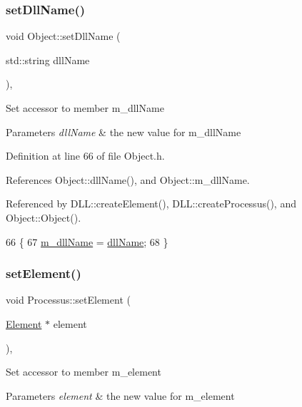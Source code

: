 \subsubsection{\texorpdfstring{set\+Dll\+Name()}{setDllName()}}
{\footnotesize\ttfamily void Object\+::set\+Dll\+Name (\begin{DoxyParamCaption}\item[{std\+::string}]{dll\+Name }\end{DoxyParamCaption})\hspace{0.3cm}{\ttfamily [inline]}, {\ttfamily [inherited]}}

Set accessor to member m\+\_\+dll\+Name 
\begin{DoxyParams}{Parameters}
{\em dll\+Name} & the new value for m\+\_\+dll\+Name \\
\hline
\end{DoxyParams}


Definition at line 66 of file Object.\+h.



References Object\+::dll\+Name(), and Object\+::m\+\_\+dll\+Name.



Referenced by D\+L\+L\+::create\+Element(), D\+L\+L\+::create\+Processus(), and Object\+::\+Object().


\begin{DoxyCode}
66                                       \{
67     \hyperlink{classObject_a01afbeacebb8db6831559972ec362eb3}{m\_dllName} = \hyperlink{classObject_a2e3947f2870094c332d7454117f3ec63}{dllName};
68   \}
\end{DoxyCode}
\mbox{\label{classProcessus_a8ddef94227d83d9dae2cd49aebc33353}} 
\subsubsection{\texorpdfstring{set\+Element()}{setElement()}}
{\footnotesize\ttfamily void Processus\+::set\+Element (\begin{DoxyParamCaption}\item[{\hyperlink{classElement}{Element} $\ast$}]{element }\end{DoxyParamCaption})\hspace{0.3cm}{\ttfamily [inline]}, {\ttfamily [inherited]}}

Set accessor to member m\+\_\+element 
\begin{DoxyParams}{Parameters}
{\em element} & the new value for m\+\_\+element \\
\hline
\end{DoxyParams}


